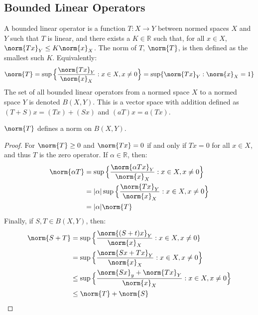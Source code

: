         \subsection{Bounded Linear Operators}
            A bounded linear operator is a function
            $T:X\rightarrow{Y}$ between normed spaces
            $X$ and $Y$ such that $T$ is linear, and
            there exists a $K\in\mathbb{R}$ such that,
            for all $x\in{X}$,
            $\norm{Tx}_{Y}\leq{K}\norm{x}_{X}$. The
            norm of $T$, $\norm{T}$, is then defined
            as the smallest such $K$. Equivalently:
            \begin{equation*}
                \norm{T}=
                \sup\Big\{\frac{\norm{Tx}_{Y}}{\norm{x}_{X}}:
                          x\in{X},x\ne{0}\Big\}
                =\sup\{\norm{Tx}_{Y}:\norm{x}_{X}=1\}
            \end{equation*}
            The set of all bounded linear operators
            from a normed space $X$ to a normed space
            $Y$ is denoted $B(X,Y)$. This is a vector
            space with addition defined as
            $(T+S)x=(Tx)+(Sx)$ and $(aT)x=a(Tx)$.
            \begin{theorem}
                $\norm{T}$ defines a norm on
                $B(X,Y)$.
            \end{theorem}
            \begin{proof}
                For $\norm{T}\geq{0}$ and
                $\norm{Tx}=0$ if and only if
                $Tx=0$ for all $x\in{X}$, and thus
                $T$ is the zero operator. If
                $\alpha\in\mathbb{R}$, then:
                \begin{align*}
                    \norm{\alpha{T}}
                    &=\sup\Big\{
                        \frac{\norm{\alpha{T}x}_{Y}}{\norm{x}_{X}}:
                        x\in{X},x\ne{0}\Big\}\\
                    &=|\alpha|\sup\Big\{
                        \frac{\norm{Tx}_{Y}}{\norm{x}_{X}}:
                        x\in{X},x\ne{0}\Big\}\\
                    &=|\alpha|\norm{T}
                \end{align*}
                Finally, if $S,T\in{B}(X,Y)$, then:
                \begin{align*}
                    \norm{S+T}&=\sup\Big\{
                        \frac{\norm{(S+t)x}_{Y}}{\norm{x}_{X}}:
                        x\in{X},x\ne{0}\}\\
                    &=\sup\Big\{
                        \frac{\norm{Sx+Tx}_{Y}}{\norm{x}_{X}}:
                        x\in{X},x\ne{0}\Big\}\\
                    &\leq\sup\Big\{
                        \frac{\norm{Sx}_{y}+\norm{Tx}_{Y}}
                             {\norm{x}_{X}}:
                        x\in{X},x\ne{0}\Big\}\\
                    &\leq\norm{T}+\norm{S}
                \end{align*}
            \end{proof}
